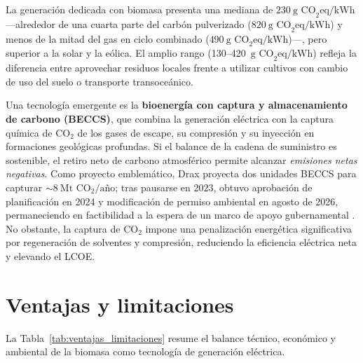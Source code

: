 La generación dedicada con biomasa presenta una mediana de $230~\text{g CO}_2\text{eq/kWh}$ ---alrededor de una cuarta parte del carbón pulverizado ($820~\text{g CO}_2\text{eq/kWh}$) y menos de la mitad del gas en ciclo combinado ($490~\text{g CO}_2\text{eq/kWh}$)---, pero superior a la solar y la eólica. El amplio rango (130--420~$\text{g CO}_2\text{eq/kWh}$) refleja la diferencia entre aprovechar residuos locales frente a utilizar cultivos con cambio de uso del suelo o transporte transoceánico.

Una tecnología emergente es la \textbf{bioenergía con captura y almacenamiento de carbono (BECCS)}, que combina la generación eléctrica con la captura química de $\mathrm{CO_2}$ de los gases de escape, su compresión y su inyección en formaciones geológicas profundas. Si el balance de la cadena de suministro es sostenible, el retiro neto de carbono atmosférico permite alcanzar \textit{emisiones netas negativas}. Como proyecto emblemático, Drax proyecta dos unidades BECCS para capturar $\sim 8~\text{Mt CO}_2/\text{año}$; tras pausarse en 2023, obtuvo aprobación de planificación en 2024 y modificación de permiso ambiental en agosto de 2026, permaneciendo en factibilidad a la espera de un marco de apoyo gubernamental \cite{carbonstorage_drax}. No obstante, la captura de $\mathrm{CO_2}$ impone una penalización energética significativa por regeneración de solventes y compresión, reduciendo la eficiencia eléctrica neta y elevando el LCOE.

\section{Ventajas y limitaciones}
\label{sec:ventajas_limitaciones}

La Tabla~\ref{tab:ventajas_limitaciones} resume el balance técnico, económico y ambiental de la biomasa como tecnología de generación eléctrica.


